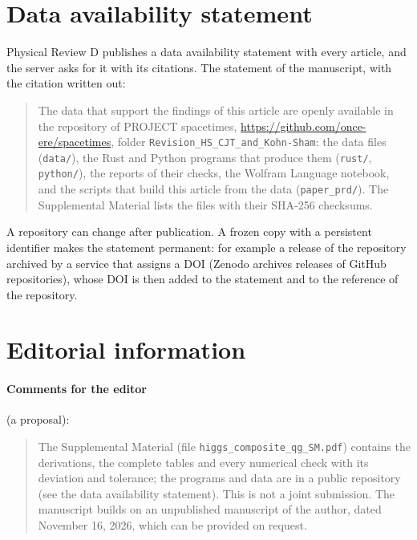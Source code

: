 \documentclass[11pt]{article}
\begin{document}
\section{Data availability statement}
\label{sec:das}

Physical Review D publishes a data availability statement with every article, and the server asks for it with its
citations. The statement of the manuscript, with the citation written out:

\begin{quote}
The data that support the findings of this article are openly available in the repository of PROJECT spacetimes,
\url{https://github.com/once-ere/spacetimes}, folder \texttt{Revision\_HS\_CJT\_and\_Kohn-Sham}: the data files
(\texttt{data/}), the Rust and Python programs that produce them (\texttt{rust/}, \texttt{python/}), the reports of their
checks, the Wolfram Language notebook, and the scripts that build this article from the data (\texttt{paper\_prd/}). The
Supplemental Material lists the files with their SHA-256 checksums.
\end{quote}

A repository can change after publication. A frozen copy with a persistent identifier makes the statement permanent: for
example a release of the repository archived by a service that assigns a DOI (Zenodo archives releases of GitHub
repositories), whose DOI is then added to the statement and to the reference of the repository.

\section{Editorial information}
\label{sec:editorial}

\paragraph{Comments for the editor} (a proposal):
\begin{quote}
The Supplemental Material (file \texttt{higgs\_composite\_qg\_SM.pdf}) contains the derivations, the complete tables and
every numerical check with its deviation and tolerance; the programs and data are in a public repository (see the data
availability statement). This is not a joint submission. The manuscript builds on an unpublished manuscript of the author,
dated November 16, 2026, which can be provided on request.
\end{quote}
\end{document}
